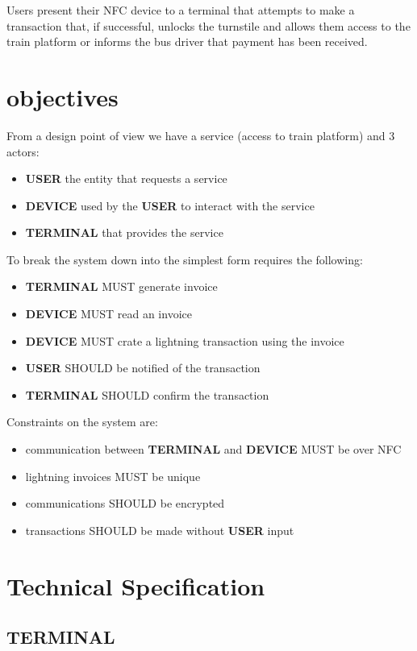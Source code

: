\documentclass[a4paper]{article}
\begin{document}
Users present their NFC device to a terminal that attempts to make a transaction
that, if successful, unlocks the turnstile and allows them access to the
train platform or informs the bus driver that payment has been received.\\

\section{objectives}
From a design point of view we have a service (access to train platform) and 3
actors:
\begin{itemize}
    \item \textbf{USER} the entity that requests a service
    \item \textbf{DEVICE} used by the \textbf{USER} to interact with the service
    \item \textbf{TERMINAL} that provides the service
\end{itemize}

To break the system down into the simplest form requires the following:
\begin{itemize}
	\item \textbf{TERMINAL} MUST generate invoice
	\item \textbf{DEVICE} MUST read an invoice
	\item \textbf{DEVICE} MUST crate a lightning transaction using the invoice
	\item \textbf{USER} SHOULD be notified of the transaction
	\item \textbf{TERMINAL} SHOULD confirm the transaction
\end{itemize}

Constraints on the system are:
\begin{itemize}
    \item communication between \textbf{TERMINAL} and \textbf{DEVICE} MUST be over NFC
    \item lightning invoices MUST be unique
	\item communications SHOULD be encrypted
	\item transactions SHOULD be made without \textbf{USER} input
\end{itemize}

\section{Technical Specification}

\subsection{\textbf{TERMINAL}}
\end{document}
